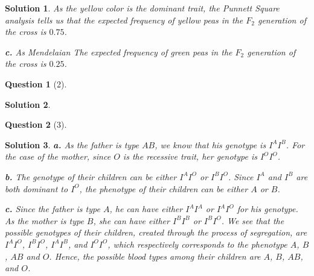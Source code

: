 \documentclass{article} %
\theoremstyle{quest}
\newtheorem*{question}{Question}
\newtheorem*{solution}{Solution}
\begin{document}
\begin{solution}
\pagebreak

As the yellow color is the dominant trait, the Punnett Square analysis tells us that
the expected frequency of yellow peas in the $F_2$ generation of the cross is $0.75$. \\

\smallskip

\textbf{c.}
As Mendelaian 
The expected frequency of green peas in the $F_2$ generation of the cross is $0.25$. \\

\smallskip

\end{solution}

\bigskip


\begin{question}[2]
\end{question}
\begin{solution}
\end{solution}

\bigskip

\begin{question}[3]
\end{question}
\begin{solution}
\textbf{a.} As the father is type $AB$, we know that his genotype is $I^A I^B$. For the case of the mother,
since $O$ is the recessive trait, her genotype is $I^O I^O$. \\

\smallskip

\textbf{b.} The genotype of their children can be either $I^A I^O$ or $I^B I^O$. Since 
$I^A$ and $I^B$ are both dominant to $I^O$, the phenotype of their children can be
either $A$ or $B$. \\

\smallskip

\textbf{c.} Since the father is type $A$, he can have either $I^A I^A$ or $I^A I^O$ 
for his genotype. As the mother is type $B$, she can have either $I^B I^B$ or $I^B I^O$.
We see that the possible genotypes of their children, created through the process of 
segregation, are $I^A I^O$, $I^B I^O$, $I^A I^B$, and $I^O I^O$, which respectively corresponds
to the phenotype $A$, $B$, $AB$ and $O$.
Hence, the possible blood types among their children are $A$, $B$, $AB$, and $O$.


\end{solution}

\bigskip
\end{document}
